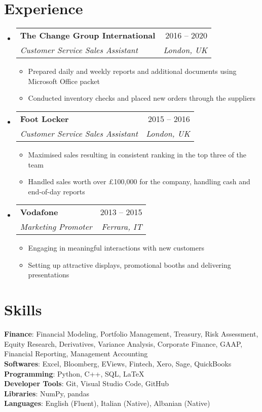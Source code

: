 \documentclass[letterpaper,11pt]{article}
\makeatletter
\newcommand{\resumeItem}[1]{
  \item\small{
    {#1 \vspace{-2pt}}
  }
}
\newcommand{\resumeSubheading}[4]{
  \vspace{-2pt}\item
    \begin{tabular*}{0.97\textwidth}[t]{l@{\extracolsep{\fill}}r}
      \textbf{#1} & #2 \\
      \textit{\small#3} & \textit{\small #4} \\
    \end{tabular*}\vspace{-7pt}
}
\newcommand{\resumeSubHeadingListStart}{\begin{itemize}[leftmargin=0.15in, label={}]}
\newcommand{\resumeSubHeadingListEnd}{\end{itemize}}
\newcommand{\resumeItemListStart}{\begin{itemize}}
\newcommand{\resumeItemListEnd}{\end{itemize}\vspace{-5pt}}
\makeatother
\begin{document}
\section{Experience}
  \resumeSubHeadingListStart

    \resumeSubheading
      {The Change Group International}{2016 -- 2020}
      {Customer Service Sales Assistant}{London, UK}
      \resumeItemListStart
        \resumeItem{Prepared daily and weekly reports and additional documents using Microsoft Office packet}
        \resumeItem{Conducted inventory checks and placed new orders through the suppliers}
      \resumeItemListEnd

    \resumeSubheading
      {Foot Locker}{2015 -- 2016}
      {Customer Service Sales Assistant}{London, UK}
      \resumeItemListStart
        \resumeItem{Maximised sales resulting in consistent ranking in the top three of the team}
        \resumeItem{Handled sales worth over £100,000 for the company, handling cash and end-of-day reports}
    \resumeItemListEnd

    \resumeSubheading
      {Vodafone}{2013 -- 2015}
      {Marketing Promoter}{Ferrara, IT}
      \resumeItemListStart
        \resumeItem{Engaging in meaningful interactions with new customers}
        \resumeItem{Setting up attractive displays, promotional booths and delivering presentations}
      \resumeItemListEnd

   \resumeSubHeadingListEnd

\section{Skills}
 \begin{itemize}[leftmargin=0.15in, label={}]
    \small{\item{
     \textbf{Finance}{: Financial Modeling, Portfolio Management, Treasury, Risk Assessment, Equity Research, Derivatives, Variance Analysis, Corporate Finance, GAAP, Financial Reporting, Management Accounting} \\
     \textbf{Softwares}{: Excel, Bloomberg, EViews, Fintech, Xero, Sage, QuickBooks} \\
     \textbf{Programming}{: Python, C++, SQL, \LaTeX} \\
     \textbf{Developer Tools}{: Git, Visual Studio Code, GitHub} \\
     \textbf{Libraries}{: NumPy, pandas} \\
     \textbf{Languages}{: English (Fluent), Italian (Native), Albanian (Native)}
    }}
 \end{itemize}
\end{document}

